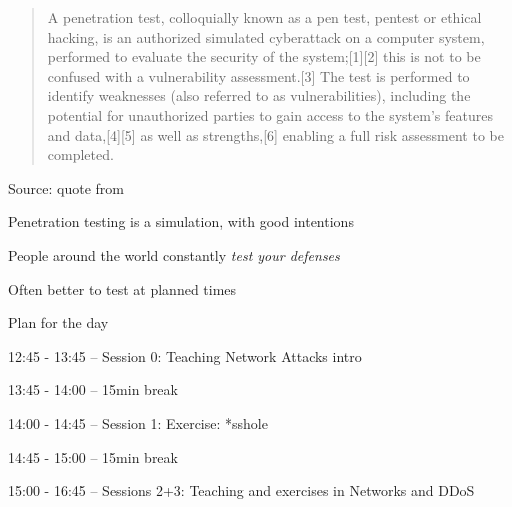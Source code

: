 \documentclass[Screen16to9,17pt]{foils}
\begin{document}

\begin{quote}
  A penetration test, colloquially known as a pen test, pentest or ethical hacking, is an authorized simulated cyberattack on a computer system, performed to evaluate the security of the system;[1][2] this is not to be confused with a vulnerability assessment.[3] The test is performed to identify weaknesses (also referred to as vulnerabilities), including the potential for unauthorized parties to gain access to the system's features and data,[4][5] as well as strengths,[6] enabling a full risk assessment to be completed.
\end{quote}
Source: quote from 

\begin{list1}
\item Penetration testing is a simulation, with good intentions
\item People around the world constantly \emph{test your defenses}
\item Often better to test at planned times
\end{list1}



Plan for the day
\begin{list1}
\item 12:45 - 13:45 -- Session 0: Teaching  Network Attacks intro
\item 13:45 - 14:00 -- 15min break
\item 14:00 - 14:45 -- Session 1: Exercise: *sshole
\item 14:45 - 15:00 -- 15min break
\item 15:00 - 16:45 -- Sessions 2+3: Teaching and exercises in Networks and DDoS
\end{list1}




\end{document}
